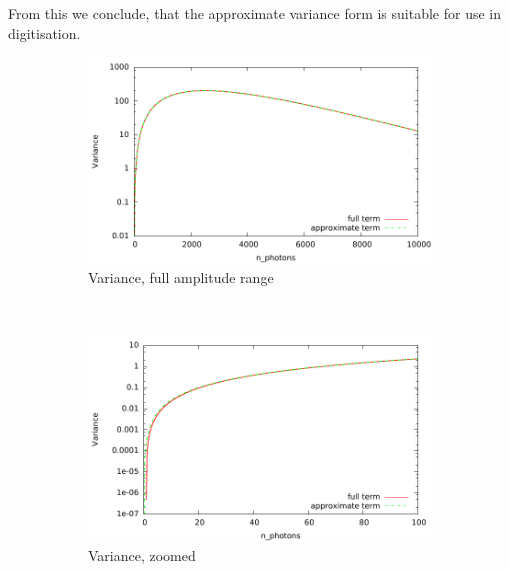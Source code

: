 \documentclass[12pt]{article} %
\begin{document}
\begin{appendices}
From this we conclude, that the approximate variance form is suitable for use in digitisation.
\begin{figure}
        \centering
        \begin{subfigure}[b]{0.5\textwidth}
                \includegraphics[width=\textwidth]{fig/comp_variance/variance}
                \caption{Variance, full amplitude range}
                \label{fig:var_full}
        \end{subfigure}%
        ~ %
        \begin{subfigure}[b]{0.5\textwidth}
                \includegraphics[width=\textwidth]{fig/comp_variance/variance_zoom}
                \caption{Variance, zoomed}
                \label{fig:var_zoom}
        \end{subfigure}
        \\
        \begin{subfigure}[b]{0.5\textwidth}

\end{subfigure}
\end{figure}
\end{appendices}
\end{document}
